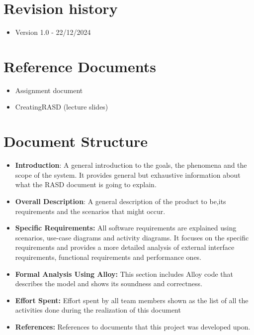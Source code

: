 \section{Revision history}
\label{sec:revision_history}%
 \begin{itemize}
     \item Version 1.0 - 22/12/2024
 \end{itemize}

\section{Reference Documents}
\label{sec:reference_documents}%
\begin{itemize}
    \item Assignment document
    \item CreatingRASD (lecture slides)
\end{itemize}


\section{Document Structure}
\label{sec:document_structure}%
\begin{itemize}
    \item \textbf{Introduction}: A general introduction to the goals, the phenomena and the scope of
            the system. It provides general but exhaustive information about what the RASD
            document is going to explain.
    \item \textbf{Overall Description}: A general description of the product to be,its requirements and the scenarios that might occur.
    \item \textbf{Specific Requirements:} All software requirements are explained using scenarios,
            use-case diagrams and activity diagrams. It focuses on the specific requirements and provides a more
            detailed analysis of external interface requirements, functional requirements and performance ones.
    \item \textbf{Formal Analysis Using Alloy:} This section includes Alloy code that describes the
            model and shows its soundness and correctness.
    \item \textbf{Effort Spent:} Effort spent by all team members shown as the list of all the activities
            done during the realization of this document
    \item \textbf{References:} References to documents that this project was developed upon.
\end{itemize}
